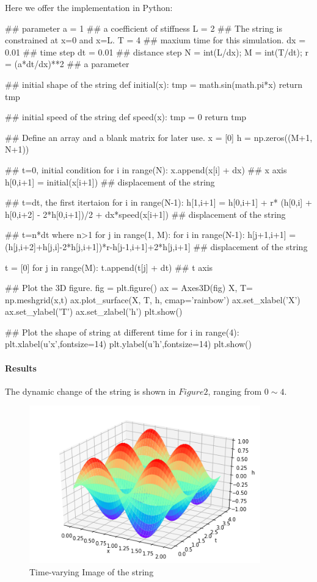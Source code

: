 \documentclass[11pt]{article}
\begin{document}
Here we offer the implementation in Python:

\begin{python}
	## parameter
	a = 1  ## a coefficient of stiffness
	L = 2  ## The string is constrained at x=0 and x=L.
	T = 4  ## maxium time for this simulation.
	dx = 0.01  ## time step
	dt = 0.01  ## distance step
	N = int(L/dx);
	M = int(T/dt);
	r = (a*dt/dx)**2  ## a parameter

	## initial shape of the string
	def initial(x):
	tmp = math.sin(math.pi*x)
	return tmp
	
	## initial speed of the string
	def speed(x):
	tmp = 0
	return tmp
	
	## Define an array and a blank matrix for later use.
	x = [0]
	h = np.zeros((M+1, N+1))
	
	## t=0, initial condition
	for i in range(N):
	x.append(x[i] + dx)  ## x axis
	h[0,i+1] = initial(x[i+1])  ## displacement of the string
	
	## t=dt, the first itertaion
	for i in range(N-1):
	h[1,i+1] = h[0,i+1] + r* (h[0,i] + h[0,i+2] - 2*h[0,i+1])/2 + dx*speed(x[i+1])
	## displacement of the string
	
	## t=n*dt where n>1
	for j in range(1, M):
	for i in range(N-1):
	h[j+1,i+1] = (h[j,i+2]+h[j,i]-2*h[j,i+1])*r-h[j-1,i+1]+2*h[j,i+1]
	## displacement of the string
	
	t = [0]
	for j in range(M):
	t.append(t[j] + dt)  ## t axis
	
	## Plot the 3D figure.
	fig = plt.figure()
	ax = Axes3D(fig)
	X, T= np.meshgrid(x,t)
	ax.plot_surface(X, T, h, cmap='rainbow')
	ax.set_xlabel('X')
	ax.set_ylabel('T')
	ax.set_zlabel('h')
	plt.show()
	
	## Plot the shape of string at different time
	for i in range(4):
	plt.xlabel(u'x',fontsize=14)
	plt.ylabel(u'h',fontsize=14)
	plt.show()
\end{python}

\paragraph{Results}

The dynamic change of the string is shown in $Figure 2$, ranging from $0\sim 4$.

\begin{figure}[htb]
	\centering
	\includegraphics[width=10cm]{3d.png}       
	\caption{Time-varying Image of the string}
\end{figure}
\end{document}
